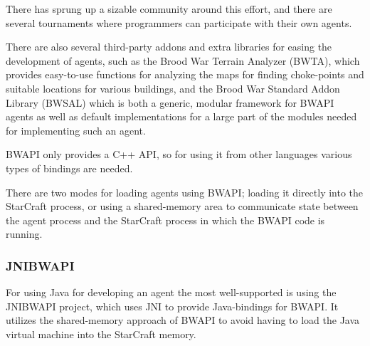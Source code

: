 There has sprung up a sizable community around this effort, and there are several tournaments where programmers can participate with their own agents.\cite{bwapi}

There are also several third-party addons and extra libraries for easing the development of agents, such as the Brood War Terrain Analyzer (BWTA), which provides easy-to-use functions for analyzing the maps for finding choke-points and suitable locations for various buildings,\cite{bwta} and the Brood War Standard Addon Library (BWSAL) which is both a generic, modular framework for BWAPI agents as well as default implementations for a large part of the modules needed for implementing such an agent.\cite{bwsal}

BWAPI only provides a C++ API, so for using it from other languages various types of bindings are needed.

There are two modes for loading agents using BWAPI; loading it directly into the StarCraft process, or using a shared-memory area to communicate state between the agent process and the StarCraft process in which the BWAPI code is running.\cite{bwapi}

\subsubsection{JNIBWAPI}
For using Java for developing an agent the most well-supported is using the JNIBWAPI project, which uses JNI to provide Java-bindings for BWAPI. It utilizes the shared-memory approach of BWAPI to avoid having to load the Java virtual machine into the StarCraft memory.

